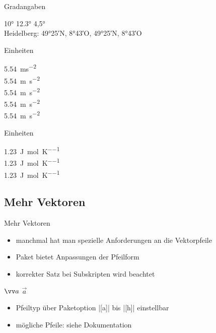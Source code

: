 \documentclass[
	vorläufig=false,
	datum=2016-11-18,
	titel={Mathematiksatz II},
	web=false,
]{../tex/latexkurs-slides}
\begin{document}
\begin{frame}[fragile]{Gradangaben}
\begin{LTXexample}
\ang{10}
\ang{12.3}
\ang{4,5}
\\ Heidelberg:
\ang{49;25;}N, \ang{8;43;}O, \ang{49;25;}N, \ang{8;43;}O
\end{LTXexample}
\end{frame}

\begin{frame}[fragile]{Einheiten}
\begin{LTXexample}[preset=\large]
\SI{5.54}{ms^{-2}}\\
\SI{5.54}{m s^{-2}}\\
\SI{5.54}{m.s^{-2}}\\
\SI{5.54}{\meter\per\second\squared}\\
\SI{5.54}{\meter\per\square\second}\\
\end{LTXexample}
\end{frame}

\begin{frame}[fragile]{Einheiten}
\begin{LTXexample}[width=.4\textwidth]
\SI{1.23}{\joule\per\mole\per\kelvin}
\\ 
\SI{1.23}{\joule\per\mole\per\kelvin}
\\ 
\SI{1.23}{\joule\per\mole\per\kelvin}
\end{LTXexample}
\end{frame}


\subsection{Mehr Vektoren}
\begin{frame}[fragile]{Mehr Vektoren}
\begin{itemize}
\item manchmal hat man spezielle Anforderungen an die Vektorpfeile
\item Paket  bietet Anpassungen der Pfeilform
\item korrekter Satz bei Subskripten wird beachtet
\end{itemize}
\begin{LTXexample}[preset={\obeylines}]
$\vv a$
$\vec a$
\end{LTXexample}
\begin{itemize}
\item Pfeiltyp über Paketoption |[a]| bis |[h]| einstellbar
\item mögliche Pfeile: siehe Dokumentation
\end{itemize}
\end{frame}
\end{document}
